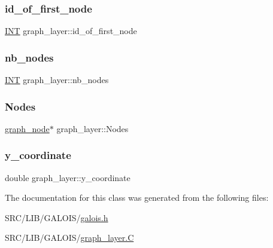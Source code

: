 \subsubsection{\texorpdfstring{id\+\_\+of\+\_\+first\+\_\+node}{id\_of\_first\_node}}
{\footnotesize\ttfamily \mbox{\hyperlink{galois_8h_a09fddde158a3a20bd2dcadb609de11dc}{I\+NT}} graph\+\_\+layer\+::id\+\_\+of\+\_\+first\+\_\+node}

\mbox{\label{classgraph__layer_aba70816fc271588e4393450b071460e0}} 
\subsubsection{\texorpdfstring{nb\+\_\+nodes}{nb\_nodes}}
{\footnotesize\ttfamily \mbox{\hyperlink{galois_8h_a09fddde158a3a20bd2dcadb609de11dc}{I\+NT}} graph\+\_\+layer\+::nb\+\_\+nodes}

\mbox{\label{classgraph__layer_a171dbfbfc7ce8a8eec093d9264f10e35}} 
\subsubsection{\texorpdfstring{Nodes}{Nodes}}
{\footnotesize\ttfamily \mbox{\hyperlink{classgraph__node}{graph\+\_\+node}}$\ast$ graph\+\_\+layer\+::\+Nodes}

\mbox{\label{classgraph__layer_aff095651d502f750af9d0f9fba2feb13}} 
\subsubsection{\texorpdfstring{y\+\_\+coordinate}{y\_coordinate}}
{\footnotesize\ttfamily double graph\+\_\+layer\+::y\+\_\+coordinate}



The documentation for this class was generated from the following files\+:\begin{DoxyCompactItemize}
\item 
S\+R\+C/\+L\+I\+B/\+G\+A\+L\+O\+I\+S/\mbox{\hyperlink{galois_8h}{galois.\+h}}\item 
S\+R\+C/\+L\+I\+B/\+G\+A\+L\+O\+I\+S/\mbox{\hyperlink{graph__layer_8_c}{graph\+\_\+layer.\+C}}\end{DoxyCompactItemize}
